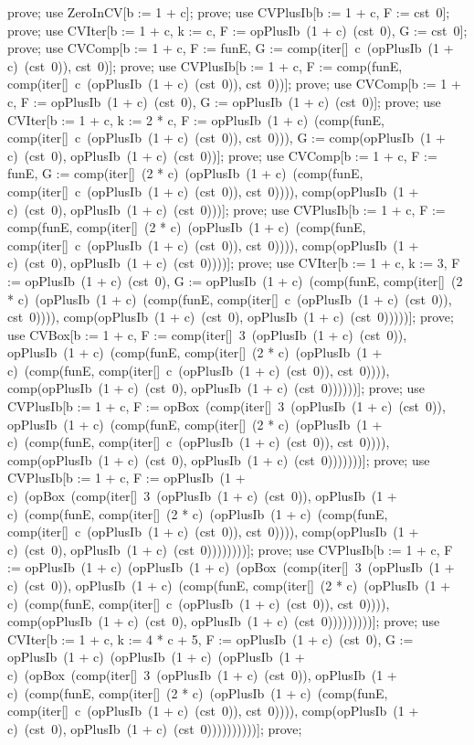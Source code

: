 \documentclass{article}
\begin{document}
\begin{zproof}
prove;
use ZeroInCV[b := 1 + c];
prove;
use CVPlusIb[b := 1 + c, F := cst~0];
prove;
use CVIter[b := 1 + c, k := c, F := opPlusIb~(1 + c)~(cst~0), G := cst~0];
prove;
use CVComp[b := 1 + c, F := funE, G := comp(iter[\nat]~c~(opPlusIb~(1 + c)~(cst~0)), cst~0)];
prove;
use CVPlusIb[b := 1 + c, F := comp(funE, comp(iter[\nat]~c~(opPlusIb~(1 + c)~(cst~0)), cst~0))];
prove;
use CVComp[b := 1 + c, F := opPlusIb~(1 + c)~(cst~0), G := opPlusIb~(1 + c)~(cst~0)];
prove;
use CVIter[b := 1 + c, k := 2 * c, F := opPlusIb~(1 + c)~(comp(funE, comp(iter[\nat]~c~(opPlusIb~(1 + c)~(cst~0)), cst~0))), G := comp(opPlusIb~(1 + c)~(cst~0), opPlusIb~(1 + c)~(cst~0))];
prove;
use CVComp[b := 1 + c, F := funE, G := comp(iter[\nat]~(2 * c)~(opPlusIb~(1 + c)~(comp(funE, comp(iter[\nat]~c~(opPlusIb~(1 + c)~(cst~0)), cst~0)))), comp(opPlusIb~(1 + c)~(cst~0), opPlusIb~(1 + c)~(cst~0)))];
prove;
use CVPlusIb[b := 1 + c, F := comp(funE, comp(iter[\nat]~(2 * c)~(opPlusIb~(1 + c)~(comp(funE, comp(iter[\nat]~c~(opPlusIb~(1 + c)~(cst~0)), cst~0)))), comp(opPlusIb~(1 + c)~(cst~0), opPlusIb~(1 + c)~(cst~0))))];
prove;
use CVIter[b := 1 + c, k := 3, F := opPlusIb~(1 + c)~(cst~0), G := opPlusIb~(1 + c)~(comp(funE, comp(iter[\nat]~(2 * c)~(opPlusIb~(1 + c)~(comp(funE, comp(iter[\nat]~c~(opPlusIb~(1 + c)~(cst~0)), cst~0)))), comp(opPlusIb~(1 + c)~(cst~0), opPlusIb~(1 + c)~(cst~0)))))];
prove;
use CVBox[b := 1 + c, F := comp(iter[\nat]~3~(opPlusIb~(1 + c)~(cst~0)), opPlusIb~(1 + c)~(comp(funE, comp(iter[\nat]~(2 * c)~(opPlusIb~(1 + c)~(comp(funE, comp(iter[\nat]~c~(opPlusIb~(1 + c)~(cst~0)), cst~0)))), comp(opPlusIb~(1 + c)~(cst~0), opPlusIb~(1 + c)~(cst~0))))))];
prove;
use CVPlusIb[b := 1 + c, F := opBox~(comp(iter[\nat]~3~(opPlusIb~(1 + c)~(cst~0)), opPlusIb~(1 + c)~(comp(funE, comp(iter[\nat]~(2 * c)~(opPlusIb~(1 + c)~(comp(funE, comp(iter[\nat]~c~(opPlusIb~(1 + c)~(cst~0)), cst~0)))), comp(opPlusIb~(1 + c)~(cst~0), opPlusIb~(1 + c)~(cst~0)))))))];
prove;
use CVPlusIb[b := 1 + c, F := opPlusIb~(1 + c)~(opBox~(comp(iter[\nat]~3~(opPlusIb~(1 + c)~(cst~0)), opPlusIb~(1 + c)~(comp(funE, comp(iter[\nat]~(2 * c)~(opPlusIb~(1 + c)~(comp(funE, comp(iter[\nat]~c~(opPlusIb~(1 + c)~(cst~0)), cst~0)))), comp(opPlusIb~(1 + c)~(cst~0), opPlusIb~(1 + c)~(cst~0))))))))];
prove;
use CVPlusIb[b := 1 + c, F := opPlusIb~(1 + c)~(opPlusIb~(1 + c)~(opBox~(comp(iter[\nat]~3~(opPlusIb~(1 + c)~(cst~0)), opPlusIb~(1 + c)~(comp(funE, comp(iter[\nat]~(2 * c)~(opPlusIb~(1 + c)~(comp(funE, comp(iter[\nat]~c~(opPlusIb~(1 + c)~(cst~0)), cst~0)))), comp(opPlusIb~(1 + c)~(cst~0), opPlusIb~(1 + c)~(cst~0)))))))))];
prove;
use CVIter[b := 1 + c, k := 4 * c + 5, F := opPlusIb~(1 + c)~(cst~0), G := opPlusIb~(1 + c)~(opPlusIb~(1 + c)~(opPlusIb~(1 + c)~(opBox~(comp(iter[\nat]~3~(opPlusIb~(1 + c)~(cst~0)), opPlusIb~(1 + c)~(comp(funE, comp(iter[\nat]~(2 * c)~(opPlusIb~(1 + c)~(comp(funE, comp(iter[\nat]~c~(opPlusIb~(1 + c)~(cst~0)), cst~0)))), comp(opPlusIb~(1 + c)~(cst~0), opPlusIb~(1 + c)~(cst~0))))))))))];
prove;
\end{zproof}
\end{document}
